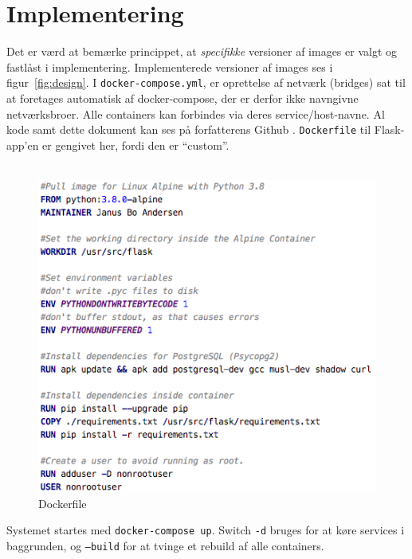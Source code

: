 \documentclass[a4paper]{article}
\begin{document}
\section{Implementering}
Det er værd at bemærke princippet, at \textit{specifikke} versioner af images er valgt og fastlåst i implementering.
Implementerede versioner af images ses i figur~\ref{fig:design}.
I \texttt{docker-compose.yml}, er oprettelse af netværk (bridges) sat til at foretages automatisk af docker-compose,
der er derfor ikke navngivne netværksbroer. Alle containers kan forbindes via deres service/host-navne.
Al kode samt dette dokument kan ses på forfatterens Github \cite{janus}.
\texttt{Dockerfile} til Flask-app'en er gengivet her, fordi den er ``custom''.
\\\\
\begin{figure}[H]
\centering
\includegraphics[width=12cm]{../img/dockerfile.png}
\caption{Dockerfile\label{fig:dockerfile}}
\end{figure}

\begin{par}
Systemet startes med \texttt{docker-compose up}.
Switch \texttt{-d} bruges for at køre services i baggrunden, og
\texttt{--build} for at tvinge et rebuild af alle containers.
\end{par}
\end{document}
